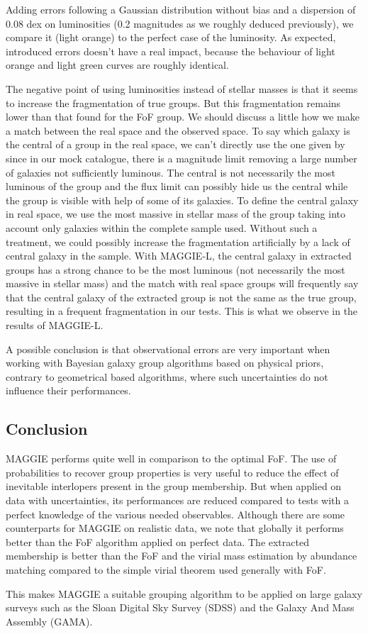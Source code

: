 Adding errors following a Gaussian distribution without bias and a dispersion
of 0.08 dex on luminosities (0.2 magnitudes as we roughly deduced previously),
we compare it (light orange) to the perfect case of the luminosity. As
expected, introduced errors doesn't have a real impact, because the behaviour
of light orange and light green curves are roughly identical.

The negative point of using luminosities instead of stellar masses is that it
seems to increase the fragmentation of true groups. But this fragmentation
remains lower than that found for the FoF group. We should discuss a little how
we make a match between the real space and the observed space. To say which
galaxy is the central of a group in the real space, we can't directly use the
one given by~\cite{Guo+11} since in our mock catalogue, there is a magnitude
limit removing a large number of galaxies not sufficiently luminous. The
central is not necessarily the most luminous of the group and the flux limit
can possibly hide us the central while the group is visible with help of some
of its galaxies. To define the central galaxy in real space, we use the most
massive in stellar mass of the group taking into account only galaxies within
the complete sample used. Without such a treatment, we could possibly increase
the fragmentation artificially by a lack of central galaxy in the sample. With
MAGGIE-L, the central galaxy in extracted groups has a strong chance to be the
most luminous (not necessarily the most massive in stellar mass) and the match
with real space groups will frequently say that the central galaxy of the
extracted group is not the same as the true group, resulting in a frequent
fragmentation in our tests. This is what we observe in the results of MAGGIE-L.

A possible conclusion is that observational errors are very important when
working with Bayesian galaxy group algorithms based on physical priors,
contrary to geometrical based algorithms, where such uncertainties do not
influence their performances.

\subsection{Conclusion}
\label{sub:maggie_discussion_conclusion}

MAGGIE performs quite well in comparison to the optimal FoF. The use of
probabilities to recover group properties is very useful to reduce the effect
of inevitable interlopers present in the group membership. But when applied on
data with uncertainties, its performances are reduced compared to tests with a
perfect knowledge of the various needed observables. Although there are some
counterparts for MAGGIE on realistic data, we note that globally it performs
better than the FoF algorithm applied on perfect data. The extracted membership
is better than the FoF and the virial mass estimation by abundance matching
compared to the simple virial theorem used generally with FoF.

This makes MAGGIE a suitable grouping algorithm to be applied on large
galaxy surveys such as the Sloan Digital Sky Survey (SDSS) and the Galaxy And
Mass Assembly (GAMA).

